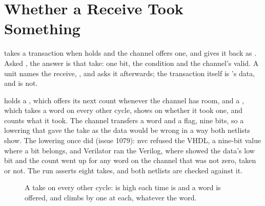 \section{Whether a Receive Took Something}
\label{sec:x-recvsome}

 takes a transaction when  holds and the
channel offers one, and gives it back as . Asked
, the answer is that take: one bit, the condition and
the channel's valid. A unit names the receive, , and asks it afterwards; the transaction itself is
's data, and  is not.

 holds a , which offers its next count
whenever the channel has room, and a , which takes a word
on every other cycle, shows on  whether it took one, and
counts what it took. The channel transfers a word and a flag, nine bits,
so a lowering that gave the take as the data would be wrong in a way
both netlists show. The lowering once did (issue 1079): nvc refused the
VHDL, a nine-bit value where a bit belongs, and Verilator ran the
Verilog, where  showed the data's low bit and the count went
up for any word on the channel that was not zero, taken or not. The
run asserts eight takes, and both netlists are checked against it.

\begin{figure}[htbp]
\centering

\caption{A take on every other cycle:  is high each time
 is and a word is offered, and  climbs by one at
each, whatever the word.}
\label{fig:x-recvsome}
\end{figure}




